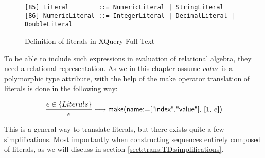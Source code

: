 \begin{figure}[h]
\begin{Verbatim}
[85] Literal        ::= NumericLiteral | StringLiteral
[86] NumericLiteral ::= IntegerLiteral | DecimalLiteral | DoubleLiteral
\end{Verbatim}
\caption[Literals in XQuery]{Definition of literals in XQuery Full Text}
\label{fig:trans:TD:litEBNF}
\end{figure}

To be able to include such expressions in evaluation of relational algebra, they need a relational representation.
As we in this chapter assume $value$ is a polymorphic type attribute, with the help of the \textsf{make} operator
translation of literals is done in the following way:

\begin{equation}
\frac{e \in \left\{Literals\right\}}{e}\longmapsto
\mbox{\textsf{make(name:=["index","value"], [1, }}e\mbox{\textsf{])}}
\label{rule:trans:TD:literal}
\end{equation}

This is a general way to translate literals, but there exists quite a few simplifications. Most importantly when
constructing sequences entirely composed of literals, as we will discuss in section
\ref{sect:trans:TD:simplifications}.

